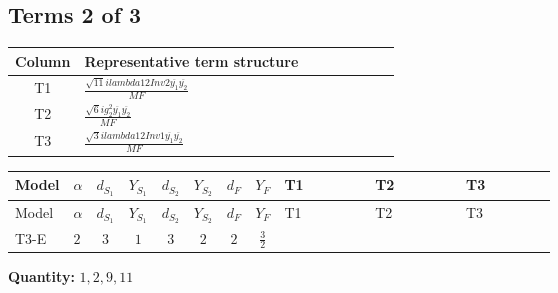 \documentclass[8pt]{article}
\begin{document}
\begin{landscape}
\subsection*{Terms 2 of 3}
\begin{center}
\begin{tabular}{@{}c >{\raggedright\arraybackslash}p{0.82\linewidth}@{}}
\toprule
Column & Representative term structure \\
\midrule
T1 & \(\displaystyle \frac{\sqrt{11} i lambda12Inv2 \overline{y_{1}} \overline{y_{2}}}{MF}\) \\
\midrule
T2 & \(\displaystyle \frac{\sqrt{6} i g_{2}^{2} \overline{y_{1}} \overline{y_{2}}}{MF}\) \\
\midrule
T3 & \(\displaystyle \frac{\sqrt{3} i lambda12Inv1 \overline{y_{1}} \overline{y_{2}}}{MF}\) \\
\midrule
\bottomrule
\end{tabular}
\end{center}
\smallskip
\tiny
\begin{longtable}{@{}llcccccc >{\raggedright\arraybackslash}p{0.21\linewidth} >{\raggedright\arraybackslash}p{0.21\linewidth} >{\raggedright\arraybackslash}p{0.21\linewidth}@{}}
\toprule
Model & $\alpha$ & $d_{S_1}$ & $Y_{S_1}$ & $d_{S_2}$ & $Y_{S_2}$ & $d_F$ & $Y_F$ & T1 & T2 & T3 \\
\midrule
\endfirsthead
\toprule
Model & $\alpha$ & $d_{S_1}$ & $Y_{S_1}$ & $d_{S_2}$ & $Y_{S_2}$ & $d_F$ & $Y_F$ & T1 & T2 & T3 \\
\midrule
\endhead
T3-E & $2$ & $3$ & $1$ & $3$ & $2$ & $2$ & $\frac{3}{2}$ & \scriptsize\adjustbox{max width=\linewidth}{$\begin{gathered} - \frac{3 \sqrt{11} i lambda12Inv2 \overline{y_{1}} \overline{y_{2}}}{22 MF}\end{gathered}$} & \scriptsize\adjustbox{max width=\linewidth}{$\begin{gathered} - \frac{\sqrt{6} i g_{2}^{2} \overline{y_{1}} \overline{y_{2}}}{6 MF}\end{gathered}$} & \scriptsize\adjustbox{max width=\linewidth}{$\begin{gathered} \frac{\sqrt{3} i lambda12Inv1 \overline{y_{1}} \overline{y_{2}}}{6 MF}\end{gathered}$} \\
\midrule
\bottomrule
\end{longtable}
\clearpage
\noindent\textbf{Quantity: }$\mathrm{1,2,9,11}$\par\smallskip

\end{landscape}
\end{document}
